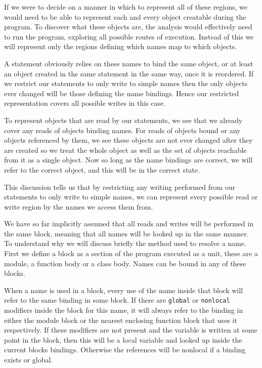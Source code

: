 \documentclass[twoside,a4paper]{report}
\begin{document}
If we were to decide on a manner in which to represent all of these regions, we would need to be able to represent each and every object creatable during the
program. To discover what these objects are, the analysis would effectively need to run the program, exploring all possible routes of execution. Instead of this
we will represent only the regions defining which names map to which objects.

A statement obviously relies on these names to bind the same object, or at least an object created in the same statement in the same way, once it is reordered.
If we restrict our statements to only write to simple names then the only objects ever changed will be those defining the name bindings. Hence our restricted
representation covers all possible writes in this case.

To represent objects that are read by our statements, we see that we already cover any reads of objects binding names. For reads of objects bound or any objects
referenced by them, we see these objects are not ever changed after they are created so we treat the whole object as well as the set of objects reachable from
it as a single object. Now so long as the name bindings are correct, we will refer to the correct object, and this will be in the correct state.

This discussion tells us that by restricting any writing performed from our statements to only write to simple names, we can represent every possible read or
write region by the names we access them from.

We have so far implicitly assumed that all reads and writes will be performed in the same block, meaning that all names will be looked up in the same manner. To
understand why we will discuss briefly the method used to resolve a name. First we define a block as a section of the program executed as a unit, these are a
module, a function body or a class body. Names can be bound in any of these blocks.

When a name is used in a block, every use of the name inside that block will refer to the same binding in some block. If there are \texttt{global} or
\texttt{nonlocal} modifiers inside the block for this name, it will always refer to the binding in either the module block or the nearest enclosing
function block that uses it respectively. If these modifiers are not present and the variable is written at some point in the block, then this will
be a local variable and looked up inside the current blocks bindings. Otherwise the references will be nonlocal if a binding exists or global.
\end{document}
